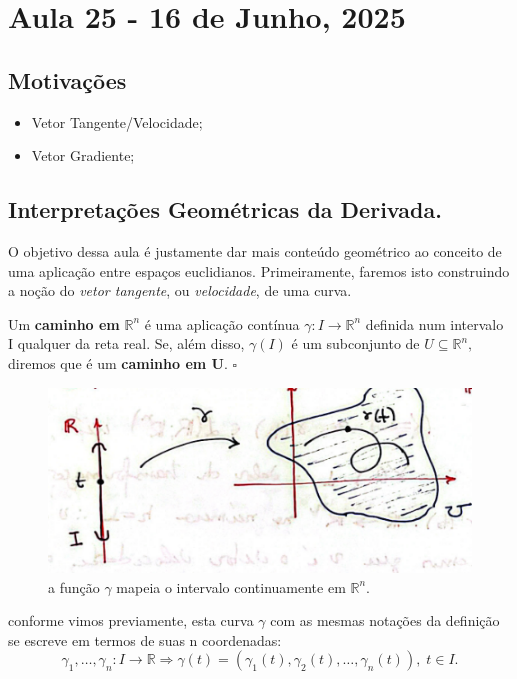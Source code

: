 \documentclass[../analysisII_notes.tex]{subfiles}
\begin{document}
\section{Aula 25 - 16 de Junho, 2025}
\subsection{Motivações}
\begin{itemize}
	\item Vetor Tangente/Velocidade;
	\item Vetor Gradiente;
\end{itemize}
\subsection{Interpretações Geométricas da Derivada.}
O objetivo dessa aula é justamente dar mais conteúdo geométrico ao conceito de uma aplicação entre espaços euclidianos. Primeiramente, faremos isto construindo a noção do \textit{vetor tangente}, ou \textit{velocidade}, de uma curva.
\begin{def*}
	Um \textbf{caminho em }\(\mathbb{R}^{n}\) é uma aplicação contínua \(\gamma :I\rightarrow \mathbb{R}^{n}\) definida num intervalo I qualquer da reta real. Se, além disso, \(\gamma(I)\) é um subconjunto de \(U\subseteq \mathbb{R}^{n},\) diremos que é um \textbf{caminho em U}. \(\square\)
\end{def*}
\begin{figure}[H]
	\begin{center}
		\includegraphics[height=\textheight, width=\textwidth, keepaspectratio]{./Images/paths_25.png}
	\end{center}
	\caption{a função \(\gamma \) mapeia o intervalo continuamente em \(\mathbb{R}^{n}\).}
\end{figure}
conforme vimos previamente, esta curva \(\gamma \) com as mesmas notações da definição se escreve em termos de suas n coordenadas:
\[
	\gamma_1,\dotsc ,\gamma_{n}:I\rightarrow \mathbb{R} \Rightarrow \gamma(t) = (\gamma_1(t), \gamma_2(t), \dotsc ,\gamma_{n}(t)),\; t\in I.
\]
\end{document}
